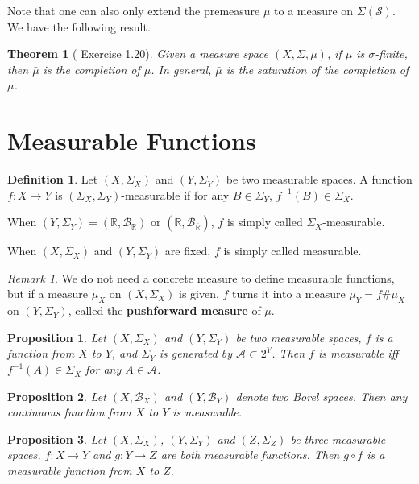 \documentclass[openany]{book}
\newtheorem{proposition}{Proposition}[chapter]
\newtheorem{theorem}{Theorem}[chapter]
\theoremstyle{definition}
\newtheorem{definition}{Definition}[chapter]
\theoremstyle{remark}
\newtheorem*{remark}{Remark}
\begin{document}
Note that one can also only extend the premeasure $\mu$ to a measure on $\Sigma(\mathcal{S})$. We have the following result.
\begin{theorem}[\cite{F13} Exercise 1.20]
    Given a measure space $(X,\Sigma,\mu)$, if $\mu$ is $\sigma$-finite, then $\bar{\mu}$ is the completion of $\mu$. In general, $\bar{\mu}$ is the saturation of the completion of $\mu$.
\end{theorem}

\section{Measurable Functions}
\begin{definition}
    Let $(X,\Sigma_X)$ and $(Y,\Sigma_Y)$ be two measurable spaces. A function $f:X\rightarrow Y$ is $(\Sigma_X,\Sigma_Y)$-measurable if for any $B\in\Sigma_Y$, $f^{-1}(B)\in\Sigma_X$.

    When $(Y,\Sigma_Y)=(\mathbb{R},\mathcal{B}_{\mathbb{R}})$ or $(\overline{\mathbb{R}},\mathcal{B}_{\overline{\mathbb{R}}})$, $f$ is simply called $\Sigma_X$-measurable.

    When $(X,\Sigma_X)$ and $(Y,\Sigma_Y)$ are fixed, $f$ is simply called measurable.
\end{definition}
\begin{remark}
    We do not need a concrete measure to define measurable functions, but if a measure $\mu_X$ on $(X,\Sigma_X)$ is given, $f$ turns it into a measure $\mu_Y=f\#\mu_X$ on $(Y,\Sigma_Y)$, called the \textbf{pushforward measure} of $\mu$.
\end{remark}
\begin{proposition}
    Let $(X,\Sigma_X)$ and $(Y,\Sigma_Y)$ be two measurable spaces, $f$ is a function from $X$ to $Y$, and $\Sigma_Y$ is generated by $\mathcal{A}\subset2^Y$. Then $f$ is measurable iff $f^{-1}(A)\in\Sigma_X$ for any $A\in \mathcal{A}$.
\end{proposition}
\begin{proposition}
    Let $(X,\mathcal{B}_X)$ and $(Y,\mathcal{B}_Y)$ denote two Borel spaces. Then any continuous function from $X$ to $Y$ is measurable.
\end{proposition}
\begin{proposition}
    Let $(X,\Sigma_X)$, $(Y,\Sigma_Y)$ and $(Z,\Sigma_Z)$ be three measurable spaces, $f:X\to Y$ and $g:Y\to Z$ are both measurable functions. Then $g\circ f$ is a measurable function from $X$ to $Z$.
\end{proposition}
\end{document}
